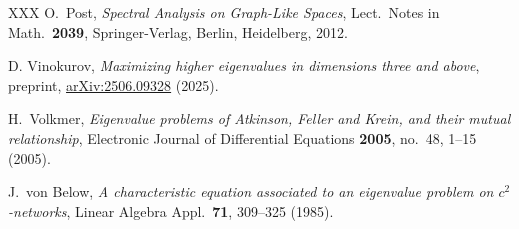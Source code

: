 \documentclass[reqno]{amsart}
\newcommand{\arxiv}[1]{\href{http://arxiv.org/abs/#1}{arXiv:#1}}
\theoremstyle{plain}
\theoremstyle{definition}
\theoremstyle{remark}
\numberwithin{equation}{section}
\begin{document}
\begin{thebibliography}{XXX}
	O.\ Post, {\em Spectral Analysis on Graph-Like Spaces}, Lect.\ Notes in Math.\ {\bf 2039}, Springer-Verlag, Berlin, Heidelberg, 2012.
	

	D. Vinokurov, {\em Maximizing higher eigenvalues in dimensions three and above}, preprint, \arxiv{2506.09328} (2025).
	
	H.\ Volkmer, {\em Eigenvalue problems of Atkinson, Feller and Krein, and their mutual relationship}, Electronic Journal of Differential Equations \textbf{2005}, no.~48, 1--15 (2005).

	J.\ von Below, {\em A characteristic equation associated to an eigenvalue problem on $c^2$-networks}, Linear Algebra Appl.\ \textbf{71}, 309--325 (1985).
	
	
\end{thebibliography}
\end{document}
